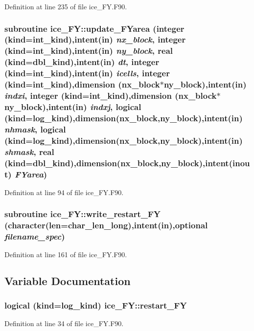 Definition at line 235 of file ice\_\-FY.F90.\hypertarget{namespaceice__FY_a4f6f4b6c28b7204e48d62a0383b1497c}{
\subsubsection[{update\_\-FYarea}]{\setlength{\rightskip}{0pt plus 5cm}subroutine ice\_\-FY::update\_\-FYarea (integer (kind=int\_\-kind),intent(in) {\em nx\_\-block}, \/  integer (kind=int\_\-kind),intent(in) {\em ny\_\-block}, \/  real (kind=dbl\_\-kind),intent(in) {\em dt}, \/  integer (kind=int\_\-kind),intent(in) {\em icells}, \/  integer (kind=int\_\-kind),dimension (nx\_\-block$\ast$ny\_\-block),intent(in) {\em indxi}, \/  integer (kind=int\_\-kind),dimension (nx\_\-block$\ast$ny\_\-block),intent(in) {\em indxj}, \/  logical (kind=log\_\-kind),dimension(nx\_\-block,ny\_\-block),intent(in) {\em nhmask}, \/  logical (kind=log\_\-kind),dimension(nx\_\-block,ny\_\-block),intent(in) {\em shmask}, \/  real (kind=dbl\_\-kind),dimension(nx\_\-block,ny\_\-block),intent(inout) {\em FYarea})}}
\label{namespaceice__FY_a4f6f4b6c28b7204e48d62a0383b1497c}


Definition at line 94 of file ice\_\-FY.F90.\hypertarget{namespaceice__FY_af12be2c743dc7e04389c68e276903b94}{
\subsubsection[{write\_\-restart\_\-FY}]{\setlength{\rightskip}{0pt plus 5cm}subroutine ice\_\-FY::write\_\-restart\_\-FY (character(len=char\_\-len\_\-long),intent(in),optional {\em filename\_\-spec})}}
\label{namespaceice__FY_af12be2c743dc7e04389c68e276903b94}


Definition at line 161 of file ice\_\-FY.F90.

\subsection{Variable Documentation}
\hypertarget{namespaceice__FY_a883caa24304b985bea44b09d23c22068}{
\subsubsection[{restart\_\-FY}]{\setlength{\rightskip}{0pt plus 5cm}logical (kind=log\_\-kind) {\bf ice\_\-FY::restart\_\-FY}}}
\label{namespaceice__FY_a883caa24304b985bea44b09d23c22068}


Definition at line 34 of file ice\_\-FY.F90.